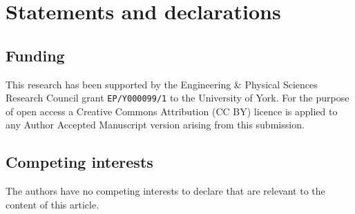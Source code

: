 \documentclass[sn-mathphys-num]{sn-jnl}%
\numberwithin{equation}{section}
\theoremstyle{thmstyleone}%
\theoremstyle{thmstyletwo}%
\theoremstyle{thmstylethree}%
\begin{document}
\section*{Statements and declarations}

\subsection*{Funding}
 This research has been supported by the Engineering \& Physical Sciences Research Council grant \verb!EP/Y000099/1! to the University of York.
For the purpose of open access a Creative Commons Attribution (CC BY) licence is applied to any Author Accepted Manuscript version arising from this submission.

\subsection*{Competing interests}
The authors have no competing interests to declare that are relevant to the content of this article.
\end{document}
